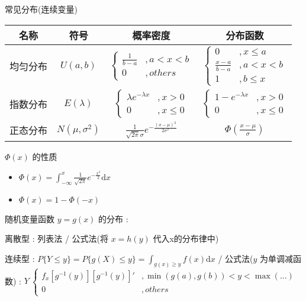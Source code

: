 \documentclass[UTF8, 12pt]{ctexart}
\begin{document}
	常见分布(连续变量)
	\begin{table}[ht]
		\begin{tabular}{|c|c|c|c|}
			\hline
			名称 & 符号 & 概率密度 & 分布函数 \\ \hline
			均匀分布 & $ U(a, b) $ & $ \begin{cases} \frac{1}{b-a}&, a < x < b \\ 0&, others \end{cases} $ & $ \begin{cases} 0&, x \leq a \\ \frac{x-a}{b-a}&, a < x < b \\ 1&, b \leq x \end{cases} $ \\ \hline
			指数分布 & $ E(\lambda) $ & $ \begin{cases} \lambda e^{-\lambda x}&, x > 0 \\ 0&, x \leq 0 \end{cases} $ & $ \begin{cases} 1-e^{-\lambda x}&, x > 0 \\ 0&, x \leq 0 \end{cases} $ \\ \hline
			正态分布 & $ N(\mu, \sigma^{2}) $ & $ \frac{1}{\sqrt{2\pi}\sigma}e^{-\frac{(x-\mu)^{2}}{2\sigma^{2}}} $ & $ \Phi(\frac{x-\mu}{\sigma}) $ \\ \hline
		\end{tabular}
	\end{table}

	$ \Phi(x) $ 的性质
	\begin{itemize}[leftmargin = 4em]
		\item $ \Phi(x) = \int_{-\infty}^{x}\frac{1}{\sqrt{2\pi}}e^{-\frac{x^{2}}{2}}\mathrm{d}x $
		\item $ \Phi(x) = 1 - \Phi(-x) $
	\end{itemize}

	随机变量函数 $ y = g(x) $ 的分布 : 

	离散型 : 列表法 / 公式法(将 $ x = h(y) $ 代入x的分布律中)

	连续型 : $ P\{Y \leq y\} = P\{g(X) \leq y \} = \int_{g(x) \geq y}f(x)\mathrm{d}x $ / 公式法($ y $ 为单调减函数) : $ Y ~ \begin{cases}f_{x}[g^{-1}(y)][g^{-1}(y)]'&, \min(g(a), g(b)) < y < \max(...) \\ 0&, others \end{cases} $
\end{document}
